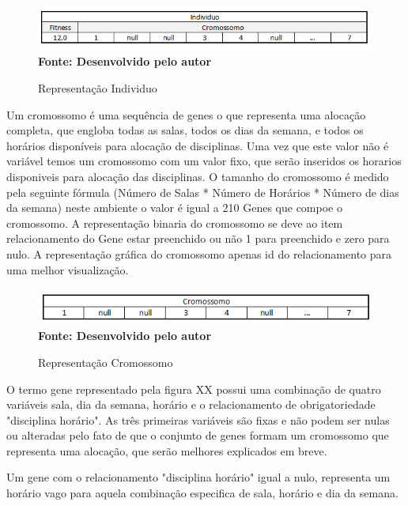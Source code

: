 \documentclass{abntpuc}
\begin{document}
\begin{figure}[!htb]
\caption[Representação Individuo]{Representação Individuo}
\label{fig:figura7}
\centering
\includegraphics[scale=0.8]{imagens/representacaoIndividuo.png}
\\ \textbf{\footnotesize Fonte: Desenvolvido pelo autor}
\end{figure}

Um cromossomo é uma sequência de genes o que representa uma alocação completa, que engloba todas as salas, todos os dias da semana, e todos os horários disponíveis
para alocação de disciplinas. Uma vez que este valor não é variável temos um cromossomo com um valor fixo, que serão inseridos os horarios disponiveis para alocação das disciplinas. O tamanho do cromossomo é medido pela seguinte fórmula (Número de Salas * Número de Horários * Número de dias da semana) neste ambiente o valor é igual a 210 Genes que compoe o cromossomo. A representação binaria do cromossomo se deve ao item relacionamento do Gene estar preenchido ou não 1 para preenchido e zero para nulo. A representação gráfica do cromossomo apenas id do relacionamento para uma melhor visualização.\par


\begin{figure}[!htb]
\caption[Representação Cromossomo]{Representação Cromossomo}
\label{fig:figura6}
\centering
\includegraphics[scale=0.8]{imagens/representacaoCromossomo.png}
\\ \textbf{\footnotesize Fonte: Desenvolvido pelo autor}
\end{figure}


O termo gene representado pela figura XX possui uma combinação de quatro variáveis sala, dia da semana, horário e o relacionamento de obrigatoriedade 
"disciplina horário". As três primeiras variáveis são fixas e não podem ser nulas ou alteradas pelo fato de que o conjunto de genes formam um cromossomo que representa uma alocação, que serão melhores explicados em breve.\par

Um gene com o relacionamento "disciplina horário" igual a nulo, representa um horário vago para aquela combinação especifica de sala, horário e dia da semana.\par
\end{document}
